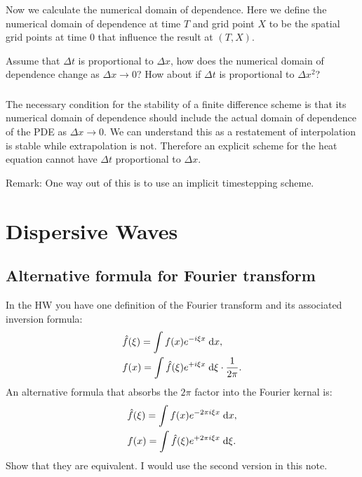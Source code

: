 \documentclass[11pt,letterpaper]{report}
\begin{document}
\subsection{}
Now we calculate the numerical domain of dependence. Here we define the numerical domain of dependence at time $T$ and grid point $X$ to be the spatial grid points at time $0$ that influence the result at $(T,X)$.

Assume that $\Delta t$ is proportional to $\Delta x$, how does the numerical domain of dependence change as $\Delta x\to 0$? How about if $\Delta t$ is proportional to $\Delta x^2$?

\subsection{}
The necessary condition for the stability of a finite difference scheme is that its numerical domain of dependence should include the actual domain of dependence of the PDE as $\Delta x\to 0$. We can understand this as a restatement of interpolation is stable while extrapolation is not. Therefore an explicit scheme for the heat equation cannot have $\Delta t$ proportional to $\Delta x$. 

Remark: One way out of this is to use an implicit timestepping scheme.

\chapter{Dispersive Waves}
\section{Alternative formula for Fourier transform}
In the HW you have one definition of the Fourier transform and its associated inversion formula:
\begin{align}
    &\hat f(\xi) = \int f(x)e^{-i\xi x} \;\mathrm{d} x,\\
    &f(x) = \int \hat f(\xi)e^{+i\xi x} \;\mathrm{d} \xi \cdot\frac{1}{2\pi}.
\end{align}
An alternative formula that absorbs the $2\pi$ factor into the Fourier kernal is:
\begin{align}
    &\hat f(\xi ) = \int f(x)e^{-2\pi i\xi x} \;\mathrm{d} x,\\
    &f(x) = \int \hat f(\xi)e^{+2\pi i \xi x} \;\mathrm{d} \xi \label{eq:Four_inv}.
\end{align}
Show that they are equivalent. I would use the second version in this note.
\end{document}
